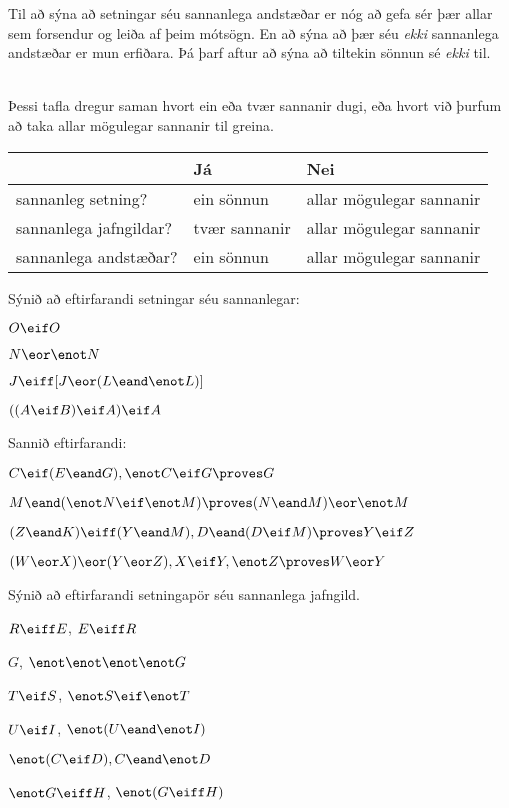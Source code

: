 Til að sýna að setningar séu sannanlega andstæðar er nóg að gefa sér þær allar sem forsendur og leiða af þeim mótsögn. En að sýna að þær séu \emph{ekki} sannanlega andstæðar er mun erfiðara. Þá þarf aftur að sýna að tiltekin sönnun sé \emph{ekki} til.

\
\\
Þessi tafla dregur saman hvort ein eða tvær sannanir dugi, eða hvort við þurfum að taka allar mögulegar sannanir til greina.

\begin{center}
\begin{tabular}{l l l}
 & \textbf{Já} & \textbf{Nei}\\
 \hline
sannanleg setning? & ein sönnun & allar mögulegar sannanir\\
sannanlega jafngildar? & tvær sannanir & allar mögulegar sannanir\\
sannanlega andstæðar? & ein sönnun & allar mögulegar sannanir\\
\end{tabular}
\end{center}


\practiceproblems
\problempart
Sýnið að eftirfarandi setningar séu sannanlegar:
\begin{earg}
\item $O \eif O$
\item $N \eor \enot N$
\item $J \eiff [J\eor (L\eand\enot L)]$
\item $((A \eif B) \eif A) \eif A$ 
\end{earg}

\problempart
Sannið eftirfarandi:
\begin{earg}
\item $C\eif(E\eand G), \enot C \eif G \proves G$
\item $M \eand (\enot N \eif \enot M) \proves (N \eand M) \eor \enot M$
\item $(Z\eand K)\eiff(Y\eand M), D\eand(D\eif M) \proves Y\eif Z$
\item $(W \eor X) \eor (Y \eor Z), X\eif Y, \enot Z \proves W\eor Y$
\end{earg}

\problempart
Sýnið að eftirfarandi setningapör séu sannanlega jafngild.
\begin{earg}
\item $R \eiff E$, $E \eiff R$
\item $G$, $\enot\enot\enot\enot G$
\item $T\eif S$, $\enot S \eif \enot T$
\item $U \eif I$, $\enot(U \eand \enot I)$
\item $\enot (C \eif D), C \eand \enot D$
\item $\enot G \eiff H$, $\enot(G \eiff H)$ 
\end{earg}

